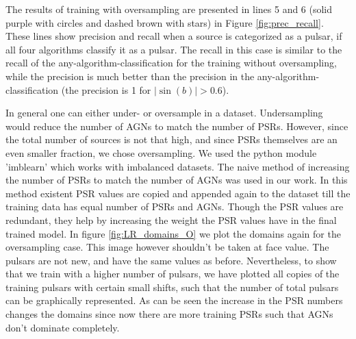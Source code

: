 The results of training with oversampling are presented in lines 5 and 6 (solid purple with circles and dashed brown with stars) in Figure \ref{fig:prec_recall}. These lines show precision and recall when a source is categorized as a pulsar, if all four algorithms classify it as a pulsar. The recall in this case is similar to the recall of the any-algorithm-classification for the training without oversampling,
while the precision is much better than the precision in the any-algorithm-classification (the precision is 1 for $|\sin(b)| > 0.6$).

In general one can either under- or oversample in a dataset. Undersampling would reduce the number of AGNs to match the number of PSRs. However, since the total number of sources is not that high, and since PSRs themselves are an even smaller fraction, we chose oversampling. We used the python module 'imblearn' which works with imbalanced datasets. The naive method of increasing the number of PSRs to match the number of AGNs was used in our work. In this method existent PSR values are copied and appended again to the dataset till the training data has equal number of PSRs and AGNs. Though the PSR values are redundant, they help by increasing the weight the PSR values have in the final trained model. In figure \ref{fig:LR_domains_O} we plot the domains again for the oversampling case. This image however shouldn't be taken at face value. The pulsars are not new, and have the same values as before. Nevertheless, to show that we train with a higher number of pulsars, we have plotted all copies of the training pulsars with certain small shifts, such that the number of total pulsars can be graphically represented. As can be seen the increase in the PSR numbers changes the domains since now there are more training PSRs such that AGNs don't dominate completely.

